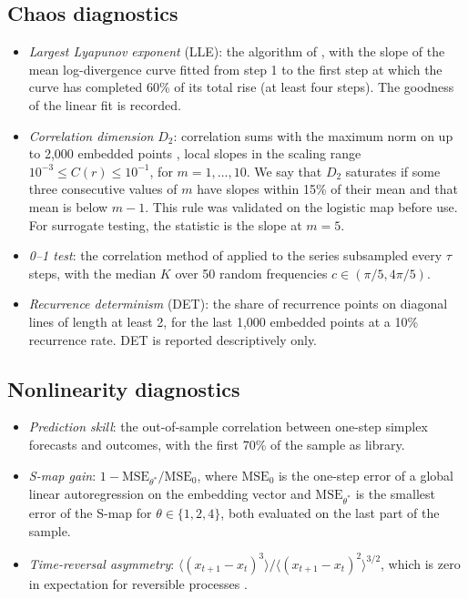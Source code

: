 \documentclass[11pt,a4paper]{article}
\begin{document}
\subsection{Chaos diagnostics}
\begin{itemize}
\item \emph{Largest Lyapunov exponent} (LLE): the algorithm of \citet{Rosenstein1993}, with the slope of the mean
log-divergence curve fitted from step 1 to the first step at which the curve has completed 60\% of its total rise
(at least four steps). The goodness of the linear fit is recorded.
\item \emph{Correlation dimension} $D_2$: correlation sums with the maximum norm on up to 2,000 embedded points
\citep{GrassbergerProcaccia1983}, local slopes in the scaling range $10^{-3}\le C(r)\le 10^{-1}$, for $m=1,\dots,10$.
We say that $D_2$ saturates if some three consecutive values of $m$ have slopes within 15\% of their mean and that
mean is below $m-1$. This rule was validated on the logistic map before use. For surrogate testing, the
statistic is the slope at $m=5$.
\item \emph{0--1 test}: the correlation method of \citet{GottwaldMelbourne2009} applied to the series subsampled
every $\tau$ steps, with the median $K$ over 50 random frequencies $c\in(\pi/5,4\pi/5)$.
\item \emph{Recurrence determinism} (DET): the share of recurrence points on diagonal lines of length at least 2,
for the last 1,000 embedded points at a 10\% recurrence rate. DET is reported descriptively only.
\end{itemize}

\subsection{Nonlinearity diagnostics}
\begin{itemize}
\item \emph{Prediction skill}: the out-of-sample correlation between one-step simplex forecasts \citep{SugiharaMay1990}
and outcomes, with the first 70\% of the sample as library.
\item \emph{S-map gain}: $1-\mathrm{MSE}_{\theta^*}/\mathrm{MSE}_{0}$, where $\mathrm{MSE}_0$ is the one-step error
of a global linear autoregression on the embedding vector and $\mathrm{MSE}_{\theta^*}$ is the smallest error of the
S-map \citep{Sugihara1994} for $\theta\in\{1,2,4\}$, both evaluated on the last part of the sample.
\item \emph{Time-reversal asymmetry}: $\langle (x_{t+1}-x_t)^3\rangle/\langle (x_{t+1}-x_t)^2\rangle^{3/2}$, which
is zero in expectation for reversible processes \citep{Diks1995,RamseyRothman1996}.
\end{itemize}
\end{document}
